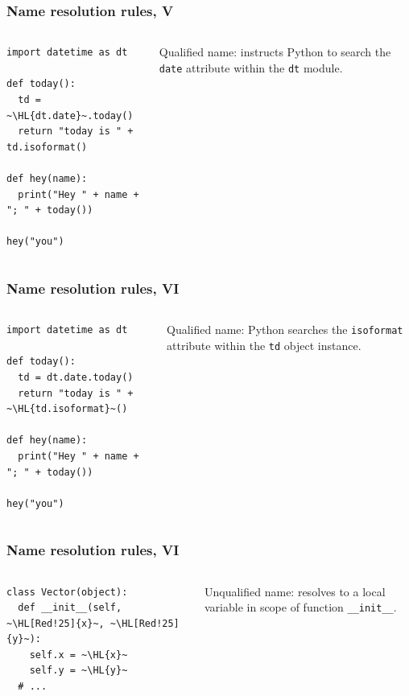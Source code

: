 \documentclass[english,serif,mathserif,xcolor=pdftex,dvipsnames,table]{beamer}
\begin{document}
\begin{frame}[fragile]
  \frametitle{Name resolution rules, V}
  \begin{columns}
    \begin{column}[t]{0.6\linewidth}
\begin{lstlisting}
import datetime as dt

def today():
  td = ~\HL{dt.date}~.today()
  return "today is " + td.isoformat()

def hey(name):
  print("Hey " + name + "; " + today())

hey("you")
\end{lstlisting}
    \end{column}
    \begin{column}[t]{0.4\linewidth}
      \raggedleft
      Qualified name: instructs Python to search the
      \texttt{date} attribute within the \texttt{dt} module.
    \end{column}
  \end{columns}
\end{frame}


\begin{frame}[fragile]
  \frametitle{Name resolution rules, VI}
  \begin{columns}
    \begin{column}[t]{0.6\linewidth}
\begin{lstlisting}
import datetime as dt

def today():
  td = dt.date.today()
  return "today is " + ~\HL{td.isoformat}~()

def hey(name):
  print("Hey " + name + "; " + today())

hey("you")
\end{lstlisting}
    \end{column}
    \begin{column}[t]{0.4\linewidth}
      \raggedleft
      Qualified name: Python searches the \texttt{isoformat} attribute
      within the \texttt{td} object instance.
    \end{column}
  \end{columns}
\end{frame}


\begin{frame}[fragile]
  \frametitle{Name resolution rules, VI}
  \begin{columns}
    \begin{column}[t]{0.6\linewidth}
\begin{lstlisting}
class Vector(object):
  def __init__(self, ~\HL[Red!25]{x}~, ~\HL[Red!25]{y}~):
    self.x = ~\HL{x}~
    self.y = ~\HL{y}~
  # ...
\end{lstlisting}
    \end{column}
    \begin{column}[t]{0.4\linewidth}
      \raggedleft
      Unqualified name: resolves to a local variable in
      scope of function \lstinline|__init__|.
    \end{column}
  \end{columns}
\end{frame}
\end{document}
